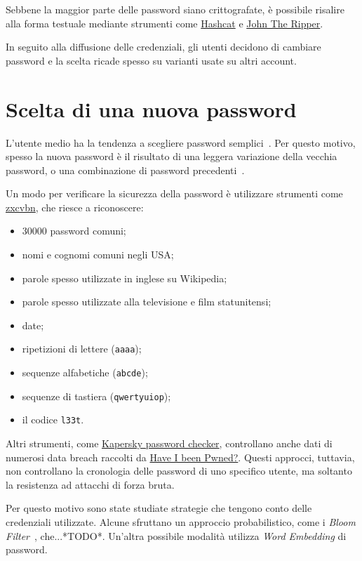 Sebbene la maggior parte delle password siano crittografate, è possibile risalire alla forma testuale mediante strumenti come \href{https://github.com/hashcat/hashcat}{Hashcat} e \href{https://github.com/openwall/john}{John The Ripper}.

In seguito alla diffusione delle credenziali, gli utenti decidono di cambiare password e la scelta ricade spesso su varianti usate su altri account.
\section{Scelta di una nuova password}

L'utente medio ha la tendenza a scegliere password semplici~\cite{obspasshab}. Per questo motivo, spesso la nuova password è il risultato di una leggera variazione della vecchia password, o una combinazione di password precedenti~\cite{hypr}.

Un modo per verificare la sicurezza della password è utilizzare strumenti come \href{https://github.com/dropbox/zxcvbn}{zxcvbn}, che riesce a riconoscere:
\begin{itemize}
    \item 30000 password comuni;
    \item nomi e cognomi comuni negli USA;
    \item parole spesso utilizzate in inglese su Wikipedia;
    \item parole spesso utilizzate alla televisione e film statunitensi;
    \item date;
    \item ripetizioni di lettere (\texttt{aaaa});
    \item sequenze alfabetiche (\texttt{abcde});
    \item sequenze di tastiera (\texttt{qwertyuiop});
    \item il codice \texttt{l33t}.
\end{itemize}

Altri strumenti, come \href{https://password.kaspersky.com/it/}{Kapersky password checker}, controllano anche dati di numerosi data breach raccolti da \href{https://haveibeenpwned.com/}{Have I been Pwned?}.
Questi approcci, tuttavia, non controllano la cronologia delle password di uno specifico utente, ma soltanto la resistenza ad attacchi di forza bruta.

Per questo motivo sono state studiate strategie che tengono conto delle credenziali utilizzate.
Alcune sfruttano un approccio probabilistico, come i \emph{Bloom Filter}~\cite{bloom}, che...*TODO*. Un'altra possibile modalità utilizza \emph{Word Embedding} di password.

